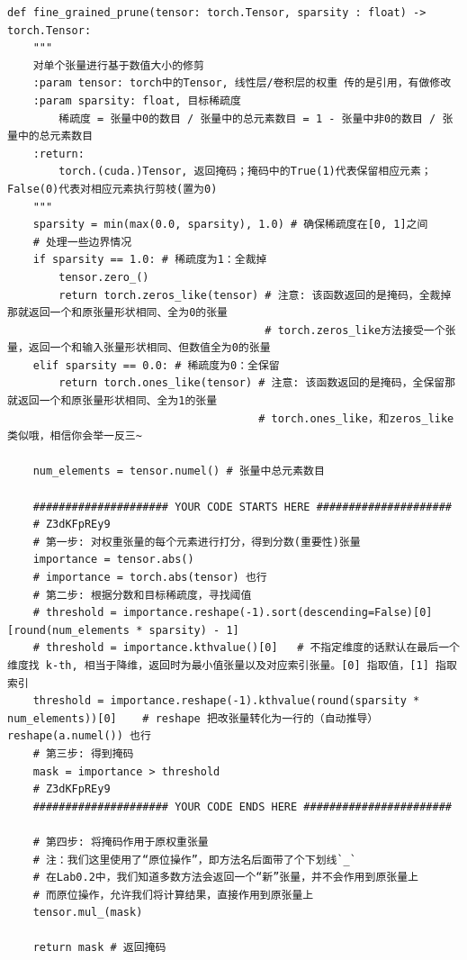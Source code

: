 \documentclass{article}
\begin{document}
\begin{verbatim}
def fine_grained_prune(tensor: torch.Tensor, sparsity : float) -> torch.Tensor:
    """
    对单个张量进行基于数值大小的修剪
    :param tensor: torch中的Tensor, 线性层/卷积层的权重 传的是引用，有做修改
    :param sparsity: float, 目标稀疏度
        稀疏度 = 张量中0的数目 / 张量中的总元素数目 = 1 - 张量中非0的数目 / 张量中的总元素数目
    :return:
        torch.(cuda.)Tensor, 返回掩码；掩码中的True(1)代表保留相应元素；False(0)代表对相应元素执行剪枝(置为0)
    """
    sparsity = min(max(0.0, sparsity), 1.0) # 确保稀疏度在[0, 1]之间
    # 处理一些边界情况
    if sparsity == 1.0: # 稀疏度为1：全裁掉
        tensor.zero_()
        return torch.zeros_like(tensor) # 注意: 该函数返回的是掩码，全裁掉那就返回一个和原张量形状相同、全为0的张量
                                        # torch.zeros_like方法接受一个张量，返回一个和输入张量形状相同、但数值全为0的张量
    elif sparsity == 0.0: # 稀疏度为0：全保留
        return torch.ones_like(tensor) # 注意: 该函数返回的是掩码，全保留那就返回一个和原张量形状相同、全为1的张量
                                       # torch.ones_like，和zeros_like类似哦，相信你会举一反三~

    num_elements = tensor.numel() # 张量中总元素数目

    ##################### YOUR CODE STARTS HERE #####################
    # Z3dKFpREy9
    # 第一步: 对权重张量的每个元素进行打分，得到分数(重要性)张量
    importance = tensor.abs()
    # importance = torch.abs(tensor) 也行
    # 第二步: 根据分数和目标稀疏度，寻找阈值
    # threshold = importance.reshape(-1).sort(descending=False)[0][round(num_elements * sparsity) - 1]
    # threshold = importance.kthvalue()[0]   # 不指定维度的话默认在最后一个维度找 k-th, 相当于降维，返回时为最小值张量以及对应索引张量。[0] 指取值，[1] 指取索引
    threshold = importance.reshape(-1).kthvalue(round(sparsity * num_elements))[0]    # reshape 把改张量转化为一行的（自动推导） reshape(a.numel()) 也行
    # 第三步: 得到掩码
    mask = importance > threshold
    # Z3dKFpREy9
    ##################### YOUR CODE ENDS HERE #######################

    # 第四步: 将掩码作用于原权重张量
    # 注：我们这里使用了“原位操作”，即方法名后面带了个下划线`_`
    # 在Lab0.2中，我们知道多数方法会返回一个“新”张量，并不会作用到原张量上
    # 而原位操作，允许我们将计算结果，直接作用到原张量上
    tensor.mul_(mask)

    return mask # 返回掩码
\end{verbatim}
\end{document}
